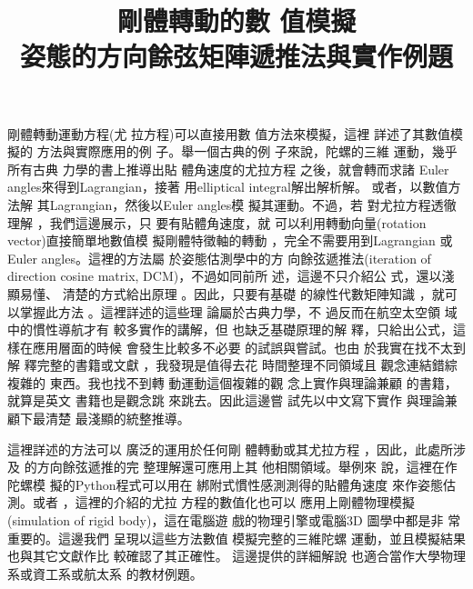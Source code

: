 \documentclass[12pt,twoside]{article}
\begin{document}
\title{
\textbf{
剛體轉動的數%
值模擬 \\}
{\large 姿態的方向餘弦矩陣遞推法與實作例題}
}
\author{}
\maketitle

%



剛體轉動運動方程(尤%
拉方程)可以直接用數%
值方法來模擬，這裡%
詳述了其數值模擬的%
方法與實際應用的例%
子。舉一個古典的例%
子來說，陀螺的三維%
運動，幾乎所有古典%
力學的書上推導出貼%
體角速度的尤拉方程%
之後，就會轉而求諸%
Euler angles來得到Lagrangian，接著%
用elliptical integral解出解析解。%
或者，以數值方法解%
其Lagrangian，然後以Euler angles模%
擬其運動。不過，若%
對尤拉方程透徹理解%
，我們這邊展示，只%
要有貼體角速度，就%
可以利用轉動向量(rotation
vector)直接簡單地數值模%
擬剛體特徵軸的轉動%
，完全不需要用到Lagrangian%
或Euler angles。這裡的方法屬%
於姿態估測學中的方%
向餘弦遞推法(iteration of direction
cosine matrix, DCM)，不過如同前所%
述，這邊不只介紹公%
式，還以淺顯易懂、%
清楚的方式給出原理%
。因此，只要有基礎%
的線性代數矩陣知識%
，就可以掌握此方法%
。這裡詳述的這些理%
論屬於古典力學，不%
過反而在航空太空領%
域中的慣性導航才有%
較多實作的講解，但%
也缺乏基礎原理的解%
釋，只給出公式，這%
樣在應用層面的時候%
會發生比較多不必要%
的試誤與嘗試。也由%
於我實在找不太到解%
釋完整的書籍或文獻%
，我發現是值得去花%
時間整理不同領域且%
觀念連結錯綜複雜的%
東西。我也找不到轉%
動運動這個複雜的觀%
念上實作與理論兼顧%
的書籍，就算是英文%
書籍\cite{goldstein}也是觀念跳%
來跳去。因此這邊嘗%
試先以中文寫下實作%
與理論兼顧下最清楚%
最淺顯的統整推導。

這裡詳述的方法可以%
廣泛的運用於任何剛%
體轉動或其尤拉方程%
，因此，此處所涉及%
的方向餘弦遞推的完%
整理解還可應用上其%
他相關領域。舉例來%
說，這裡在作陀螺模%
擬的Python程式可以用在%
綁附式慣性感測\cite[Ch 3.6.4]%
{titterton}測得的貼體角速度%
來作姿態估測。或者%
，這裡的介紹的尤拉%
方程的數值化也可以%
應用上剛體物理模擬%
(simulation of rigid body)，這在電腦遊%
戲的物理引擎或電腦3D%
圖學\cite[Ch 2.3]{pixarnote}中都是非%
常重要的。這邊我們%
呈現以這些方法數值%
模擬完整的三維陀螺%
運動，並且模擬結果%
也與其它文獻\cite{hasbun}作比%
較確認了其正確性。%
這邊提供的詳細解說%
也適合當作大學物理%
系或資工系或航太系%
的教材例題。
\end{document}
